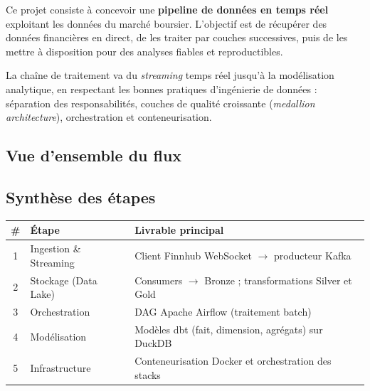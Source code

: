 \documentclass[11pt,a4paper]{article}
\begin{document}
Ce projet consiste à concevoir une \textbf{pipeline de données en temps réel}
exploitant les données du marché boursier. L'objectif est de récupérer des
données financières en direct, de les traiter par couches successives, puis de
les mettre à disposition pour des analyses fiables et reproductibles.

La chaîne de traitement va du \emph{streaming} temps réel jusqu'à la
modélisation analytique, en respectant les bonnes pratiques d'ingénierie de
données : séparation des responsabilités, couches de qualité croissante
(\emph{medallion architecture}), orchestration et conteneurisation.

\subsection{Vue d'ensemble du flux}

\begin{center}
\end{center}

\subsection{Synthèse des étapes}

\begin{center}
\renewcommand{\arraystretch}{1.3}
\begin{tabularx}{\linewidth}{@{}clX@{}}
\toprule
\textbf{\#} & \textbf{Étape} & \textbf{Livrable principal} \\
\midrule
1 & Ingestion \& Streaming & Client Finnhub WebSocket $\rightarrow$ producteur Kafka \\
2 & Stockage (Data Lake)   & Consumers $\rightarrow$ Bronze ; transformations Silver et Gold \\
3 & Orchestration          & DAG Apache Airflow (traitement batch) \\
4 & Modélisation           & Modèles dbt (fait, dimension, agrégats) sur DuckDB \\
5 & Infrastructure         & Conteneurisation Docker et orchestration des stacks \\
\bottomrule
\end{tabularx}
\end{center}
\end{document}
